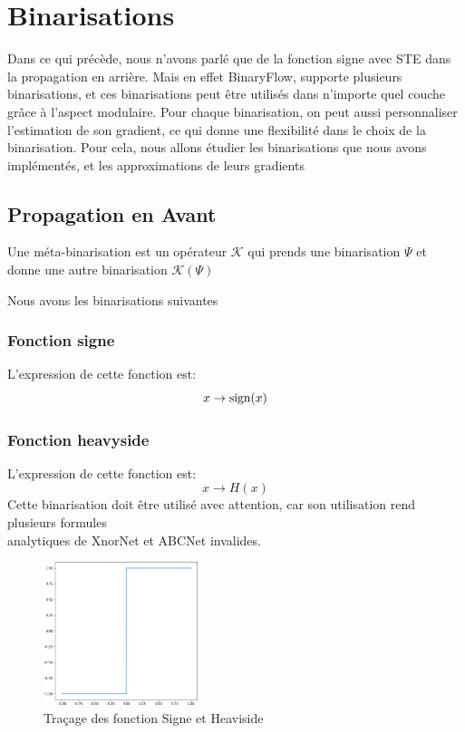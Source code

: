 \newpage 
\section{Binarisations}
Dans ce qui précède, nous n'avons parlé que de la fonction signe avec STE dans la propagation en arrière. Mais en effet BinaryFlow, supporte plusieurs binarisations, et ces binarisations peut être utilisés dans n'importe quel couche grâce à l'aspect modulaire.
\newline Pour chaque binarisation, on peut aussi personnaliser l'estimation de son gradient, ce qui donne une flexibilité dans le choix de la binarisation. 
\newline Pour cela, nous allons étudier les binarisations que nous avons implémentés, et les approximations de leurs gradients
\subsection{Propagation en Avant}
\begin{definition}
	Une méta-binarisation est un opérateur $\mathcal{K}$ qui prends une binarisation $\Psi$ et donne une autre binarisation $\mathcal{K}(\Psi)$
\end{definition}
Nous avons les binarisations suivantes
\subsubsection{Fonction signe}
L'expression de cette fonction est:
\begin{equation}
	x\rightarrow \operatorname{sign} (x)
\end{equation}
\subsubsection{Fonction heavyside}
L'expression de cette fonction est:
\begin{equation}
	x\rightarrow H (x)
\end{equation}
Cette binarisation doit être utilisé avec attention, car son utilisation rend plusieurs formules \\ analytiques de XnorNet et ABCNet invalides.
\begin{figure}[htp!]
	\centering
	\includegraphics[width=0.4\textwidth]{Figures/sign-cropped.png}
	\caption{Traçage des fonction Signe et Heaviside}
	\label{fig:Sign-Heaviside}
\end{figure}
\FloatBarrier
